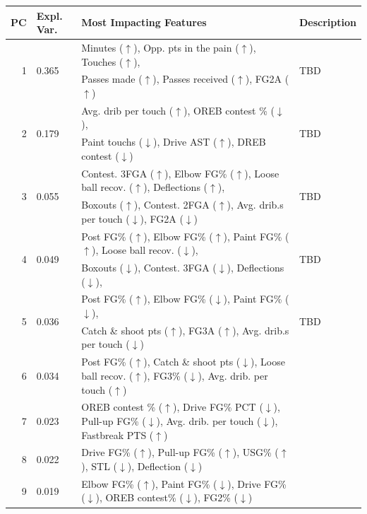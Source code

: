 \begin{tabular}{rlll}
\toprule
PC & Expl. Var. & Most Impacting Features & Description \\
\midrule
\multirow{2}{*}{1} & \multirow{2}{*}{0.365} & Minutes ($\uparrow$), Opp. pts in the pain ($\uparrow$), Touches ($\uparrow$), & \multirow{2}{*}{TBD} \\
& & Passes made ($\uparrow$), Passes received ($\uparrow$), FG2A ($\uparrow$) &  \\
\midrule
\multirow{2}{*}{2} & \multirow{2}{*}{0.179} & Avg. drib per touch ($\uparrow$), OREB contest \% ($\downarrow$), & \multirow{2}{*}{TBD}\\
& & Paint touchs ($\downarrow$), Drive AST ($\uparrow$), DREB contest ($\downarrow$) &  \\
\midrule
\multirow{2}{*}{3} & \multirow{2}{*}{0.055} & Contest. 3FGA ($\uparrow$), Elbow FG\% ($\uparrow$), Loose ball recov. ($\uparrow$), Deflections ($\uparrow$), & \multirow{2}{*}{TBD} \\
& & Boxouts ($\uparrow$), Contest. 2FGA ($\uparrow$), Avg. drib.s per touch ($\downarrow$), FG2A ($\downarrow$) &  \\
\midrule
\multirow{2}{*}{4} & \multirow{2}{*}{0.049} & Post FG\% ($\uparrow$), Elbow FG\% ($\uparrow$), Paint FG\% ($\uparrow$), Loose ball recov. ($\downarrow$), & \multirow{2}{*}{TBD}\\
& & Boxouts ($\downarrow$), Contest. 3FGA ($\downarrow$), Deflections ($\downarrow$),  &  \\
\midrule
\multirow{2}{*}{5} & \multirow{2}{*}{0.036} & Post FG\% ($\uparrow$), Elbow FG\% ($\downarrow$), Paint FG\% ($\downarrow$), & \multirow{2}{*}{TBD} \\
& & Catch \& shoot pts ($\uparrow$), FG3A ($\uparrow$), Avg. drib.s per touch ($\downarrow$) &  \\
\midrule
6 & 0.034 & Post FG\% ($\uparrow$), Catch \& shoot pts ($\downarrow$), Loose ball recov. ($\uparrow$), FG3\% ($\downarrow$), Avg. drib. per touch ($\uparrow$) &  \\
\midrule
7 & 0.023 &  OREB contest \% ($\uparrow$), Drive FG\% PCT ($\downarrow$), Pull-up FG\% ($\downarrow$), Avg. drib. per touch ($\downarrow$), Fastbreak PTS ($\uparrow$) &  \\
\midrule
8 & 0.022 & Drive FG\% ($\uparrow$), Pull-up FG\% ($\uparrow$), USG\% ($\uparrow$), STL ($\downarrow$), Deflection ($\downarrow$) &  \\
\midrule
9 & 0.019 & Elbow FG\% ($\uparrow$), Paint FG\% ($\downarrow$), Drive FG\% ($\downarrow$), OREB contest\% ($\downarrow$), FG2\% ($\downarrow$) &  \\

\end{tabular}

